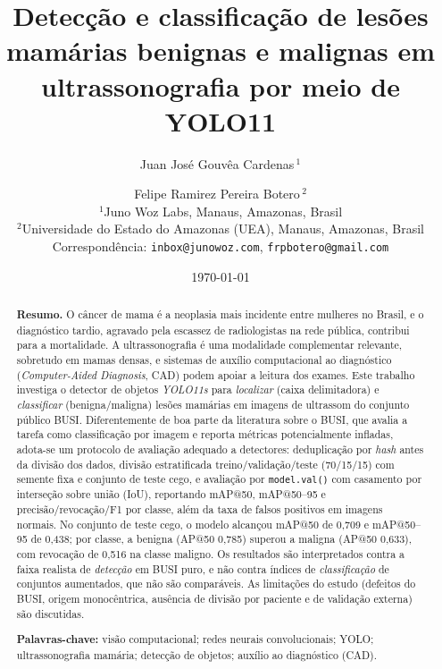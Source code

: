 \documentclass[11pt,a4paper]{article}
\title{\textbf{Detecção e classificação de lesões mamárias benignas e
malignas em ultrassonografia por meio de YOLO11}}
\author{%
Juan José Gouvêa Cardenas\,$^{1}$
\and
Felipe Ramirez Pereira Botero\,$^{2}$
\\[4pt]
{\small $^{1}$Juno Woz Labs, Manaus, Amazonas, Brasil}\\
{\small $^{2}$Universidade do Estado do Amazonas (UEA), Manaus, Amazonas, Brasil}\\
{\small Correspondência: \texttt{inbox@junowoz.com}, \texttt{frpbotero@gmail.com}}
}
\date{\today}
\begin{document}
\maketitle

\begin{abstract}
\noindent\textbf{Resumo.} O câncer de mama é a neoplasia mais incidente entre
mulheres no Brasil, e o diagnóstico tardio, agravado pela escassez de
radiologistas na rede pública, contribui para a mortalidade. A
ultrassonografia é uma modalidade complementar relevante, sobretudo em mamas
densas, e sistemas de auxílio computacional ao diagnóstico (\textit{Computer-Aided
Diagnosis}, CAD) podem apoiar a leitura dos exames. Este trabalho investiga o
detector de objetos \emph{YOLO11s} para \emph{localizar} (caixa delimitadora) e
\emph{classificar} (benigna/maligna) lesões mamárias em imagens de ultrassom do
conjunto público BUSI. Diferentemente de boa parte da literatura sobre o BUSI,
que avalia a tarefa como classificação por imagem e reporta métricas
potencialmente infladas, adota-se um protocolo de avaliação adequado a
detectores: deduplicação por \emph{hash} antes da divisão dos dados, divisão
estratificada treino/validação/teste (70/15/15) com semente fixa e conjunto de
teste cego, e avaliação por \texttt{model.val()} com casamento por interseção
sobre união (IoU), reportando mAP@50, mAP@50--95 e precisão/revocação/F1 por
classe, além da taxa de falsos positivos em imagens normais. No conjunto de
teste cego, o modelo alcançou mAP@50 de 0,709 e mAP@50--95 de 0,438; por classe,
a benigna (AP@50 0,785) superou a maligna (AP@50 0,633), com revocação de 0,516
na classe maligno. Os resultados são interpretados contra a faixa realista de
\emph{detecção} em BUSI puro, e não contra índices de \emph{classificação} de
conjuntos aumentados, que não são comparáveis. As limitações do estudo (defeitos
do BUSI, origem monocêntrica, ausência de divisão por paciente e de validação
externa) são discutidas.

\medskip
\noindent\textbf{Palavras-chave:} visão computacional; redes neurais
convolucionais; YOLO; ultrassonografia mamária; detecção de objetos; auxílio ao
diagnóstico (CAD).
\end{abstract}
\end{document}
